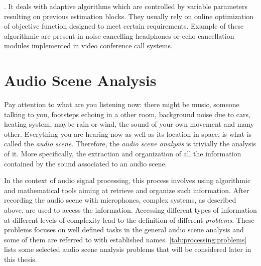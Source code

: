 .
    It deals with adaptive algorithms which are controlled by variable parameters resulting on previous estimation blocks.
    They usually rely on online optimization of objective function designed to meet certain requirements.
    Example of these algorithmic are present in noise cancelling headphones or echo cancellation modules implemented in video conference call systems.

\section{Audio Scene Analysis}\label{sec:intro:scene}
Pay attention to what are you listening now:
there might be music, someone talking to you, footsteps echoing in a other room, background noise due to cars, heating system, maybe rain or wind, the sound of your own movement and many other.
Everything you are hearing now as well as its location in space, is what is called the \textit{audio scene}.
Therefore, the \textit{audio scene analysis} is trivially the analysis of it.
More specifically, the extraction and organization of all the information contained by the sound associated to an audio scene.

\mynewline
In the context of audio signal processing, this process involves using algorithmic and mathematical tools aiming at retrieve and organize such information.
After recording the audio scene with microphones, complex systems, as described above, are used to access the information.
Accessing different types of information at different levels of complexity lead to the definition of different \textit{problems}.
These problems focuses on well defined tasks in the general audio scene analysis and some of them are referred to with established names.
\cref{tab:processing:problems} lists some selected audio scene analysis problems that will be considered later in this thesis.

